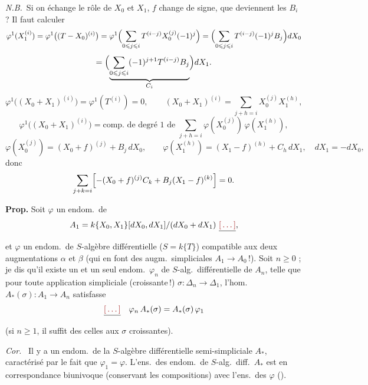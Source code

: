 \documentclass[11pt,a4paper]{article}
\begin{document}
\emph{N.B.}\ Si on échange le rôle de $X_0$ et $X_1$, $f$ change de signe,
que deviennent les $B_i$ ? Il faut calculer
\[
  \varphi^1(X_1^{(i)}) = \varphi^1\bigl((T - X_0)^{(i)}\bigr)
  = \varphi^1\Bigl(\sum_{0 \leqslant j \leqslant i} T^{(i-j)} X_0^{(j)} (-1)^j\Bigr)
  = \Bigl(\sum_{0 \leqslant j \leqslant i} T^{(i-j)} (-1)^j B_j\Bigr) dX_0
\]
\[
  = \Bigl(\underbrace{\sum_{0 \leqslant j \leqslant i} (-1)^{j+1} T^{(i-j)} B_j}_{C_i}\Bigr) dX_1 .
\]
\[
  \varphi^1\bigl((X_0 + X_1)^{(i)}\bigr) = \varphi^1(T^{(i)}) = 0 ,
  \qquad
  (X_0 + X_1)^{(i)} = \sum_{j+h=i} X_0^{(j)} X_1^{(h)} ,
\]
\[
  \varphi^1\bigl((X_0 + X_1)^{(i)}\bigr)
  = \text{comp.\ de degré 1 de }\sum_{j+h=i} \varphi(X_0^{(j)})\,\varphi(X_1^{(h)}) ,
\]
\[
  \varphi(X_0^{(j)}) = (X_0 + f)^{(j)} + B_j\,dX_0 ,
  \qquad
  \varphi(X_1^{(h)}) = (X_1 - f)^{(h)} + C_h\,dX_1 , \quad dX_1 = -dX_0 ,
\]
donc
\[
  \sum_{j+k=i} \Bigl[ -(X_0 + f)^{(j)} C_k + B_j (X_1 - f)^{(k)} \Bigr] = 0 .
\]

\textbf{Prop.} Soit $\varphi$ un endom.\ de
\[
  A_1 = k\{X_0, X_1\}[dX_0, dX_1]/(dX_0 + dX_1)\ \struck{\ill{}} ,
\]
et $\varphi$ \struck{\ill{}} un endom.\ de $S$-algèbre différentielle
($S = k\{T\}$) compatible aux deux augmentations $\alpha$ et $\beta$ (qui en font
des augm.\ simpliciales $A_1 \to A_0$\,!). Soit $n \geqslant 0$ ; je dis qu'il
existe un et un seul endom.\ $\varphi_n$ de $S$-alg.\ différentielle de $A_n$,
telle que pour toute application simpliciale (croissante\,!)
$\sigma : \Delta_n \to \Delta_1$, l'hom.\ $A_*(\sigma) : A_1 \to A_n$ satisfasse
\[
  \struck{\ill{}} \quad \varphi_n\, A_*(\sigma) = A_*(\sigma)\, \varphi_1
\]
 (si $n \geqslant 1$, il suffit  \struck{\ill{}} des
celles  aux $\sigma$ croissantes).

\emph{Cor.}\  Il y a un endom.\ de la $S$-algèbre différentielle
semi-simpliciale $A_*$, caractérisé par le fait que $\varphi_1 = \varphi$.
L'ens.\ des endom.\ de $S$-alg.\ diff.\ $A_*$ est en correspondance
biunivoque (conservant les compositions) avec l'ens.\ des $\varphi$
(\uncertain{vérifiant la prop.}).
\marginal{en bas, en oblique : \ill{}}
\end{document}

